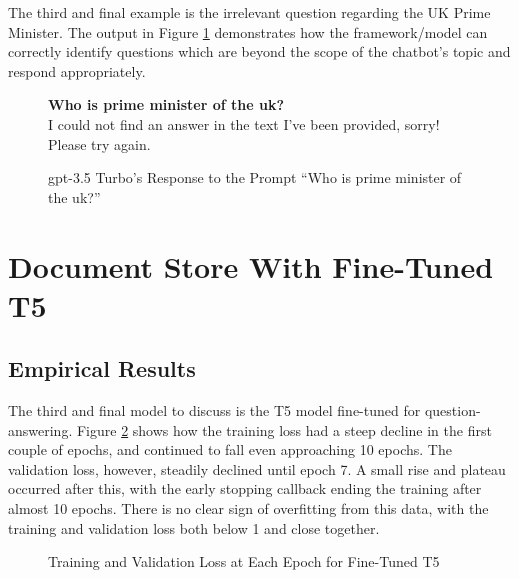 The third and final example is the irrelevant question regarding the UK Prime Minister. The output in Figure \ref{fig:results_gpt_ex3} demonstrates how the framework/model can correctly identify questions which are beyond the scope of the chatbot's topic and respond appropriately.

\begin{figure}[ht!]
    \begin{itquote}
        \textbf{Who is prime minister of the uk?} \\
        I could not find an answer in the text I've been provided, sorry! Please try again.
    \end{itquote}
    \caption{\acrshort{gpt}-3.5 Turbo's Response to the Prompt ``Who is prime minister of the uk?''}
    \label{fig:results_gpt_ex3}
\end{figure}

\section{Document Store With Fine-Tuned T5}\label{sec:results_t5}
\subsection{Empirical Results}\label{sec:results_t5_empirical}
The third and final model to discuss is the T5 model fine-tuned for question-answering. Figure \ref{fig:results_t5_loss} shows how the training loss had a steep decline in the first couple of epochs, and continued to fall even approaching 10 epochs. The validation loss, however, steadily declined until epoch 7. A small rise and plateau occurred after this, with the early stopping callback ending the training after almost 10 epochs. There is no clear sign of overfitting from this data, with the training and validation loss both below 1 and close together. 

\begin{figure}[ht!]
\centering
\caption{Training and Validation Loss at Each Epoch for Fine-Tuned T5}
\label{fig:results_t5_loss}
\end{figure}

